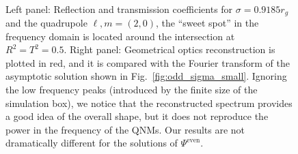 \documentclass[article,aps,nofootinbib,twocolumn,superscriptaddress]{revtex4-1}
\begin{document}
\begin{figure}[t!]
\centering
{} \,
\caption{\label{fig:RT_reconst} Left panel: Reflection and transmission coefficients for $\sigma=0.9185r_g$ and the quadrupole $\ell,m=(2,0)$, the ``sweet spot'' in the frequency domain is located around the intersection at $R^2=T^2=0.5$. Right panel: Geometrical optics reconstruction is plotted in red, and it is compared with the Fourier transform of the asymptotic solution shown in Fig.~\ref{fig:odd_sigma_small}. Ignoring the low frequency peaks (introduced by the finite size of the simulation box), we notice that the reconstructed spectrum provides a good idea of the overall shape, but it does not reproduce the power in the frequency of the QNMs. Our results are not dramatically different for the solutions of $\Psi^{\mathrm{even}}$.} 
\end{figure}
\end{document}
